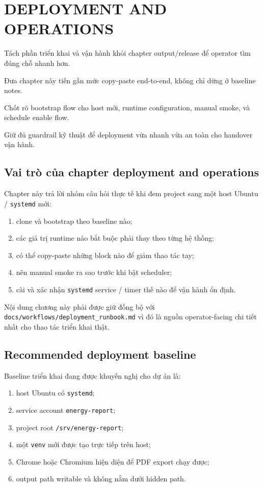 \chapter{DEPLOYMENT AND OPERATIONS}

\begin{ChapterObjectives}
\item Tách phần triển khai và vận hành khỏi chapter output/release để operator tìm đúng chỗ nhanh hơn.
\item Đưa chapter này tiến gần mức copy-paste end-to-end, không chỉ dừng ở baseline notes.
\item Chốt rõ bootstrap flow cho host mới, runtime configuration, manual smoke, và schedule enable flow.
\item Giữ đủ guardrail kỹ thuật để deployment vừa nhanh vừa an toàn cho handover vận hành.
\end{ChapterObjectives}

\section{Vai trò của chapter deployment and operations}

Chapter này trả lời nhóm câu hỏi thực tế khi đem project sang một host Ubuntu / \texttt{systemd} mới:

\begin{enumerate}[label=-]
\item clone và bootstrap theo baseline nào;
\item các giá trị runtime nào bắt buộc phải thay theo từng hệ thống;
\item có thể copy-paste những block nào để giảm thao tác tay;
\item nên manual smoke ra sao trước khi bật scheduler;
\item cài và xác nhận \texttt{systemd} service / timer thế nào để vận hành ổn định.
\end{enumerate}

Nội dung chương này phải được giữ đồng bộ với \texttt{docs/workflows/deployment\_runbook.md} vì đó là nguồn operator-facing chi tiết nhất cho thao tác triển khai thật.

\section{Recommended deployment baseline}

Baseline triển khai đang được khuyến nghị cho dự án là:

\begin{enumerate}[label=-]
\item host Ubuntu có \texttt{systemd};
\item service account \texttt{energy-report};
\item project root \texttt{/srv/energy-report};
\item một \texttt{venv} mới được tạo trực tiếp trên host;
\item Chrome hoặc Chromium hiện diện để PDF export chạy được;
\item output path writable và không nằm dưới hidden path.
\end{enumerate}


